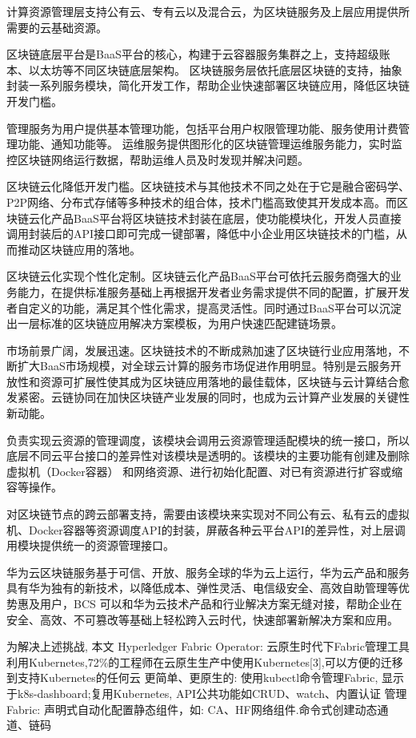 计算资源管理层支持公有云、专有云以及混合云，为区块链服务及上层应用提供所需要的云基础资源。

区块链底层平台是BaaS平台的核心，构建于云容器服务集群之上，支持超级账本、以太坊等不同区块链底层架构。
区块链服务层依托底层区块链的支持，抽象封装一系列服务模块，简化开发工作，帮助企业快速部署区块链应用，降低区块链开发门槛。

管理服务为用户提供基本管理功能，包括平台用户权限管理功能、服务使用计费管理功能、通知功能等。
运维服务提供图形化的区块链管理运维服务能力，实时监控区块链网络运行数据，帮助运维人员及时发现并解决问题。

区块链云化降低开发门槛。区块链技术与其他技术不同之处在于它是融合密码学、P2P网络、分布式存储等多种技术的组合体，技术门槛高致使其开发成本高。而区块链云化产品BaaS平台将区块链技术封装在底层，使功能模块化，开发人员直接调用封装后的API接口即可完成一键部署，降低中小企业用区块链技术的门槛，从而推动区块链应用的落地。

区块链云化实现个性化定制。区块链云化产品BaaS平台可依托云服务商强大的业务能力，在提供标准服务基础上再根据开发者业务需求提供不同的配置，扩展开发者自定义的功能，满足其个性化需求，提高灵活性。同时通过BaaS平台可以沉淀出一层标准的区块链应用解决方案模板，为用户快速匹配建链场景。

市场前景广阔，发展迅速。区块链技术的不断成熟加速了区块链行业应用落地，不断扩大BaaS市场规模，对全球云计算的服务市场促进作用明显。特别是云服务开放性和资源可扩展性使其成为区块链应用落地的最佳载体，区块链与云计算结合愈发紧密。云链协同在加快区块链产业发展的同时，也成为云计算产业发展的关键性新动能。

负责实现云资源的管理调度，该模块会调用云资源管理适配模块的统一接口，所以底层不同云平台接口的差异性对该模块是透明的。该模块的主要功能有创建及删除虚拟机（Docker容器） 和网络资源、进行初始化配置、对已有资源进行扩容或缩容等操作。

对区块链节点的跨云部署支持，需要由该模块来实现对不同公有云、私有云的虚拟机、Docker容器等资源调度API的封装，屏蔽各种云平台API的差异性，对上层调用模块提供统一的资源管理接口。


华为云区块链服务基于可信、开放、服务全球的华为云上运行，华为云产品和服务具有华为独有的新技术，以降低成本、弹性灵活、电信级安全、高效自助管理等优势惠及用户，BCS 可以和华为云技术产品和行业解决方案无缝对接，帮助企业在安全、高效、不可篡改等基础上轻松跨入云时代，快速部署新解决方案和应用。

为解决上述挑战, 本文
Hyperledger Fabric Operator: 云原生时代下Fabric管理工具
利用Kubernetes,72\%的工程师在云原生生产中使用Kubernetes[3],可以方便的迁移到支持Kubernetes的任何云 
更简单、更原生的: 使用kubectl命令管理Fabric, 显示于k8s-dashboard;复用Kubernetes, API公共功能如CRUD、watch、内置认证
管理Fabric: 声明式自动化配置静态组件，如: CA、HF网络组件.命令式创建动态通道、链码








